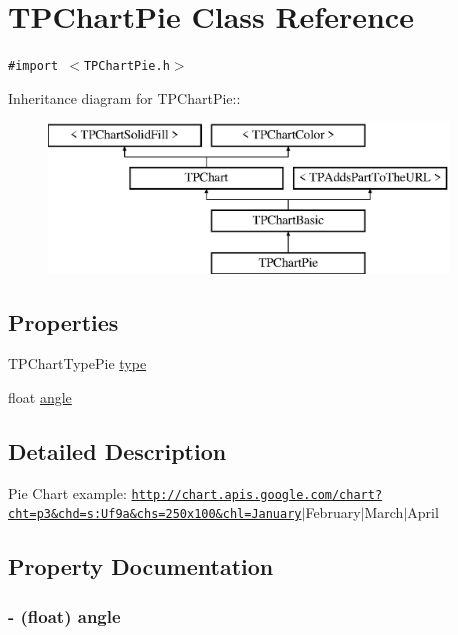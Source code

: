 \hypertarget{interface_t_p_chart_pie}{
\section{TPChartPie Class Reference}
\label{interface_t_p_chart_pie}
}
{\tt \#import $<$TPChartPie.h$>$}

Inheritance diagram for TPChartPie::\begin{figure}[H]
\begin{center}
\leavevmode
\includegraphics[height=4cm]{interface_t_p_chart_pie}
\end{center}
\end{figure}
\subsection*{Properties}
\begin{CompactItemize}
\item 
TPChartTypePie \hyperlink{interface_t_p_chart_pie_f9a2aea3325ac699501b0cbea394e0d7}{type}
\item 
float \hyperlink{interface_t_p_chart_pie_03ce748bdb6e02278b78963049dee536}{angle}
\end{CompactItemize}


\subsection{Detailed Description}
Pie Chart example: \href{http://chart.apis.google.com/chart?cht=p3&chd=s:Uf9a&chs=250x100&chl=January}{\tt http://chart.apis.google.com/chart?cht=p3\&chd=s:Uf9a\&chs=250x100\&chl=January}$|$February$|$March$|$April 

\subsection{Property Documentation}
\hypertarget{interface_t_p_chart_pie_03ce748bdb6e02278b78963049dee536}{
\subsubsection[{angle}]{\setlength{\rightskip}{0pt plus 5cm}- (float) angle}}
\label{interface_t_p_chart_pie_03ce748bdb6e02278b78963049dee536}


